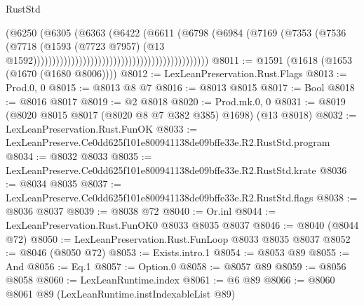 \begin{lexlean}{RustStd}
\begin{coremodule}
                                                                      (@6250
                                                                        (@6305
                                                                          (@6363
                                                                            (@6422
                                                                              (@6611
                                                                                (@6798
                                                                                  (@6984
                                                                                    (@7169
                                                                                      (@7353
                                                                                        (@7536
                                                                                          (@7718
                                                                                            (@1593
                                                                                              (@7723
                                                                                                @7957)
                                                                                              (@13
                                                                                                @1592))))))))))))))))))))))))))))))))))))))))))))))
@8011 := @1591 (@1618 (@1653 (@1670 (@1680 @8006))))
@8012 := LexLeanPreservation.Rust.Flags
@8013 := Prod.{0, 0}
@8015 := @8013 @8 @7
@8016 := @8013 @8015
@8017 := Bool
@8018 := @8016 @8017
@8019 := @2 @8018
@8020 := Prod.mk.{0, 0}
@8031 := @8019 (@8020 @8015 @8017 (@8020 @8 @7 @382 @385) @1698) (@13 @8018)
@8032 := LexLeanPreservation.Rust.FunOK
@8033 := LexLeanPreserve.Ce0dd625f101e800941138de09bffe33e.R2.RustStd.program
@8034 := @8032 @8033
@8035 := LexLeanPreserve.Ce0dd625f101e800941138de09bffe33e.R2.RustStd.krate
@8036 := @8034 @8035
@8037 := LexLeanPreserve.Ce0dd625f101e800941138de09bffe33e.R2.RustStd.flags
@8038 := @8036 @8037
@8039 := @8038 @72
@8040 := Or.inl
@8044 := LexLeanPreservation.Rust.FunOK0 @8033 @8035 @8037
@8046 := @8040 (@8044 @72)
@8050 := LexLeanPreservation.Rust.FunLoop @8033 @8035 @8037
@8052 := @8046 (@8050 @72)
@8053 := Exists.intro.{1}
@8054 := @8053 @89
@8055 := And
@8056 := Eq.{1}
@8057 := Option.{0}
@8058 := @8057 @89
@8059 := @8056 @8058
@8060 := LexLeanRuntime.index
@8061 := @6 @89
@8066 := @8060 @8061 @89 (LexLeanRuntime.instIndexableList @89)

\end{coremodule}
\end{lexlean}
